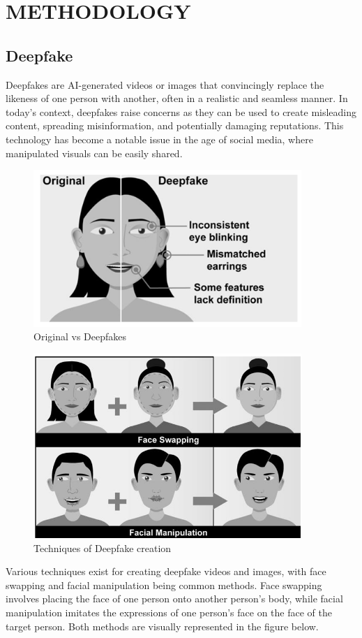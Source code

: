 \section{METHODOLOGY}
\subsection{Deepfake}
Deepfakes are AI-generated videos or images that convincingly replace the likeness of one person with another, often in a realistic and seamless manner. In today's context, deepfakes raise concerns as they can be used to create misleading content, spreading misinformation, and potentially damaging reputations. This technology has become a notable issue in the age of social media, where manipulated visuals can be easily shared.\\
\begin{figure}[htbp]
    \centering
    \includegraphics[width=4in]{img/deefakeface.png}
    \caption{{Original vs Deepfakes }}
\end{figure}


\begin{figure}[htbp]
    \centering
    \includegraphics[width=4in]{img/face manipulation.png}
    \caption{{Techniques of Deepfake creation}}
\end{figure}
Various techniques exist for creating deepfake videos and images, with face swapping and facial manipulation being common methods. Face swapping involves placing the face of one person onto another person's body, while facial manipulation imitates the expressions of one person's face on the face of the target person. Both methods are visually represented in the figure below.\\



